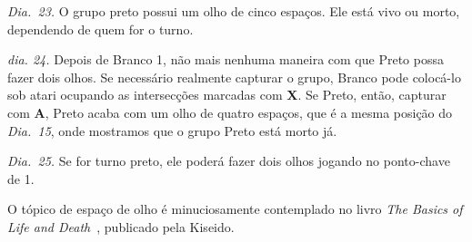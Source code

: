 \emph{Dia.\@~23.} O grupo preto possui um olho de cinco espaços. Ele está vivo ou morto, dependendo de quem for o turno.

\emph{dia. 24.} Depois de Branco 1, não mais nenhuma maneira com que Preto possa fazer dois olhos. Se necessário realmente capturar o grupo, Branco pode colocá-lo sob atari ocupando as intersecções marcadas com \textbf{X}. Se Preto, então, capturar com \textbf{A}, Preto acaba com um olho de quatro espaços, que é a mesma posição do \emph{Dia.\@~15}, onde mostramos que o grupo Preto está morto já.

\emph{Dia.\@~25.} Se for turno preto, ele poderá fazer dois olhos jogando no ponto-chave de 1.

O tópico de espaço de olho é minuciosamente contemplado no livro \emph{The Basics of Life and Death}~\cite{zeijst_bozulich_basics_of_life_and_death}, publicado pela Kiseido.